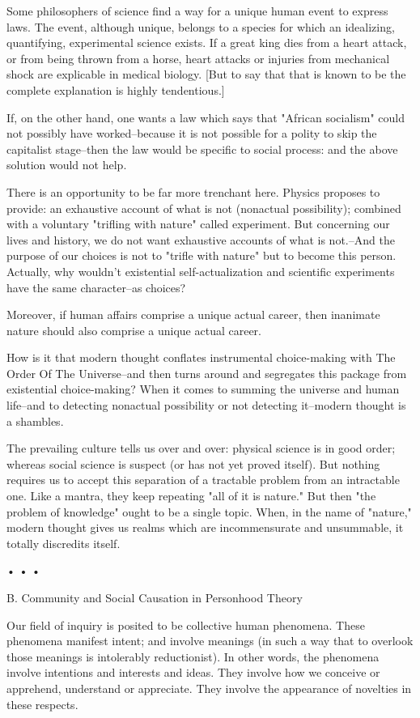\begin{enumerate}[label=\alph*.]
Some philosophers of science find a way for a unique human event to express laws. The event, although unique, belongs to a species for which an idealizing, quantifying, experimental science exists. If a great king dies from a heart attack, or from being thrown from a horse, heart attacks or injuries from mechanical shock are explicable in medical biology. [But to say that that is known to be the complete explanation is highly tendentious.]

If, on the other hand, one wants a law which says that "African socialism" could not possibly have worked–because it is not possible for a polity to skip the capitalist stage–then the law would be specific to social process: and the above solution would not help.

There is an opportunity to be far more trenchant here. Physics proposes to provide: an exhaustive account of what is not (nonactual possibility); combined with a voluntary "trifling with nature" called experiment. But concerning our lives and history, we do not want exhaustive accounts of what is not.–And the purpose of our choices is not to "trifle with nature" but to become this person. Actually, why wouldn’t existential self-actualization and scientific experiments have the same character–as choices?

Moreover, if human affairs comprise a unique actual career, then inanimate nature should also comprise a unique actual career.

How is it that modern thought conflates instrumental choice-making with The Order Of The Universe–and then turns around and segregates this package from existential choice-making? When it comes to summing the universe and human life–and to detecting nonactual possibility or not detecting it–modern thought is a shambles.

The prevailing culture tells us over and over: physical science is in good order; whereas social science is suspect (or has not yet proved itself). But nothing requires us to accept this separation of a tractable problem from an intractable one. Like a mantra, they keep repeating "all of it is nature." But then "the problem of knowledge" ought to be a single topic. When, in the name of "nature," modern thought gives us realms which are incommensurate and unsummable, it totally discredits itself.

• • •

B. Community and Social Causation in Personhood Theory

Our field of inquiry is posited to be collective human phenomena. These phenomena manifest intent; and involve meanings (in such a way that to overlook those meanings is intolerably reductionist). In other words, the phenomena involve intentions and interests and ideas. They involve how we conceive or apprehend, understand or appreciate. They involve the appearance of novelties in these respects.


\end{enumerate}
